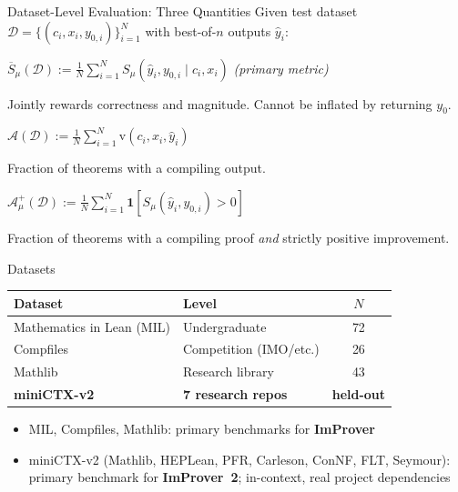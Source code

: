 \begin{frame}{Dataset-Level Evaluation: Three Quantities}
\vspace{0.2em}
Given test dataset $\mathcal{D} = \{(c_i, x_i, y_{0,i})\}_{i=1}^N$ with best-of-$n$ outputs $\hat{y}_i$:
\vspace{0.3em}
\begin{definition}
$\overline{S}_\mu(\mathcal{D}) := \frac{1}{N}\sum_{i=1}^{N} S_\mu(\hat{y}_i, y_{0,i} \mid c_i, x_i)$ \quad \emph{(primary metric)}
\end{definition}
\vspace{0.1em}
\small Jointly rewards correctness and magnitude. Cannot be inflated by returning $y_0$.
\vspace{0.4em}
\begin{definition}
$\mathcal{A}(\mathcal{D}) := \frac{1}{N}\sum_{i=1}^{N}\mathrm{v}(c_i, x_i, \hat{y}_i)$
\end{definition}
\vspace{0.1em}
\small Fraction of theorems with a compiling output.
\vspace{0.4em}
\begin{definition}
$\mathcal{A}^+_\mu(\mathcal{D}) := \frac{1}{N}\sum_{i=1}^{N}\mathbf{1}[S_\mu(\hat{y}_i, y_{0,i}) > 0]$
\end{definition}
\vspace{0.1em}
\small Fraction of theorems with a compiling proof \emph{and} strictly positive improvement.
\end{frame}

\begin{frame}{Datasets}
\vspace{0.5em}
\begin{center}
\small
\begin{tabular}{llc}
\toprule
\textbf{Dataset} & \textbf{Level} & \textbf{$N$}\\
\midrule
Mathematics in Lean (MIL) & Undergraduate & 72\\
Compfiles & Competition (IMO/etc.) & 26\\
Mathlib & Research library & 43\\
\midrule
\textbf{miniCTX-v2} & \textbf{7 research repos} & \textbf{held-out}\\
\bottomrule
\end{tabular}
\end{center}
\vspace{0.5em}
\begin{itemize}\setlength{\itemsep}{6pt}
  \item MIL, Compfiles, Mathlib: primary benchmarks for \textbf{ImProver}
  \item miniCTX-v2 (Mathlib, HEPLean, PFR, Carleson, ConNF, FLT, Seymour): primary benchmark for \textbf{ImProver~2}; in-context, real project dependencies
\end{itemize}
\end{frame}

